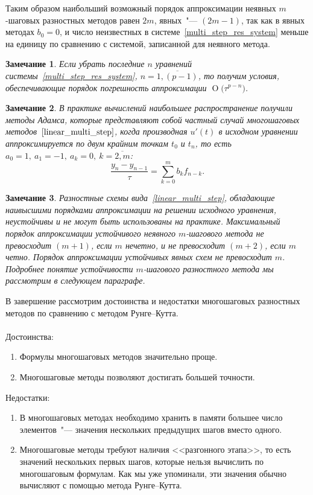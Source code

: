 \documentclass[11pt,a4paper,twoside]{report}
\numberwithin{equation}{section}
\theoremstyle{definition}
\theoremstyle{plain}
\newtheorem{note}{Замечание}[section]
\newcommand{\bigO}[1]{\ensuremath{\operatorname{O}\bigl(#1\bigr)}}
\begin{document}
Таким образом наибольший возможный порядок аппроксимации неявных
$m$-шаговых разностных методов равен $2m$, явных~"--- $(2m-1)$,
так как в явных методах $b_0 = 0$, и число неизвестных
в системе~\eqref{multi_step_res_system} меньше на единицу по сравнению с
системой, записанной для неявного метода.
%
\begin{note}
%
    Если убрать последние $n$ уравнений системы~\eqref{multi_step_res_system},
    $n=\overline{1,(p-1)}$,
    то получим условия, обеспечивающие порядок погрешность аппроксимации
    $\bigO{\tau^{p-n}}$.
%
\end{note}
%
\begin{note}
%
    В практике вычислений наибольшее распространение получили
    методы Адамса, которые представляют собой частный случай многошаговых
    методов~$\eqref{linear_multi_step}$, когда производная $u'(t)$ в исходном уравнении
    аппроксимируется
    по двум крайним точкам $t_0$ и $t_n$, то есть
    $a_0=1,~a_1=-1,~a_k=0,~k=\overline{2,m}$:
    $$
        \frac{y_n-y_{n-1}}{\tau}=\sum_{k=0}^mb_kf_{n-k}.
    $$
%
\end{note}
%
\begin{note}
%
    Разностные схемы вида~\eqref{linear_multi_step}, обладающие наивысшими порядками аппроксимации
    на решении исходного уравнения, неустойчивы и не могут быть использованы
    на практике. Максимальный порядок аппроксимации устойчивого неявного $m$-шагового метода
    не превосходит $(m+1)$, если $m$ нечетно, и не превосходит $(m+2)$, если $m$ четно.
    Порядок аппроксимации устойчивых явных схем не превосходит $m$.
    Подробнее понятие устойчивости $m$-шагового разностного метода мы
    рассмотрим в следующем параграфе.
%
\end{note}
%

В завершение рассмотрим достоинства и недостатки многошаговых разностных
методов по сравнению с методом Рунге--Кутта.\\~\\
Достоинства:
%
\begin{enumerate}
%
    \item Формулы многошаговых методов значительно проще.
    \item Многошаговые методы позволяют достигать большей точности.
%
\end{enumerate}
%
Недостатки:
%
\begin{enumerate}
%
    \item В многошаговых методах необходимо хранить в памяти большее число элементов~"---
        значения нескольких предыдущих шагов вместо одного.
    \item Многошаговые методы требуют наличия <<разгонного этапа>>, то есть значений нескольких
        первых шагов, которые нельзя вычислить по многошаговым формулам. Как мы уже упоминали,
        эти значения обычно вычисляют с помощью метода Рунге--Кутта.
%
\end{enumerate}
%
\end{document}
